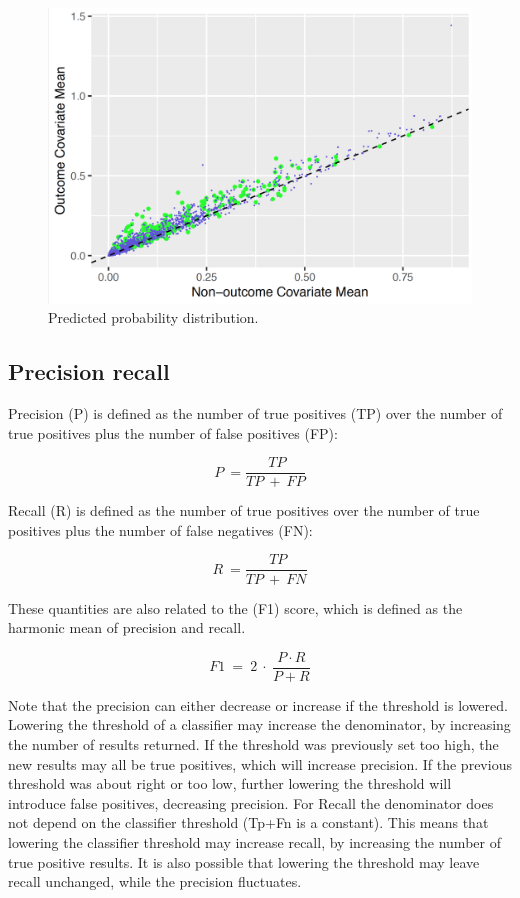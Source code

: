 \documentclass[11pt]{book}
\begin{document}
\begin{figure}

{\centering \includegraphics[width=1\linewidth]{images/PatientLevelPrediction/variableScatterplot} 

}

\caption{Predicted probability distribution.}\label{fig:plpVarScatter}
\end{figure}

\subsection{Precision recall}\label{precision-recall}

Precision (P) is defined as the number of true positives (TP) over the
number of true positives plus the number of false positives (FP):

\[P\ =\frac{\ TP}{TP\ +\ FP}\]

Recall (R) is defined as the number of true positives over the number of
true positives plus the number of false negatives (FN):

\[R\ =\frac{\ TP}{TP\ +\ FN}\]

These quantities are also related to the (F1) score, which is defined as
the harmonic mean of precision and recall.

\[F1\ =\ 2\ \cdot\ \frac{P\cdot R}{P+R}\]

Note that the precision can either decrease or increase if the threshold
is lowered. Lowering the threshold of a classifier may increase the
denominator, by increasing the number of results returned. If the
threshold was previously set too high, the new results may all be true
positives, which will increase precision. If the previous threshold was
about right or too low, further lowering the threshold will introduce
false positives, decreasing precision. For Recall the denominator does
not depend on the classifier threshold (Tp+Fn is a constant). This means
that lowering the classifier threshold may increase recall, by
increasing the number of true positive results. It is also possible that
lowering the threshold may leave recall unchanged, while the precision
fluctuates.
\end{document}
